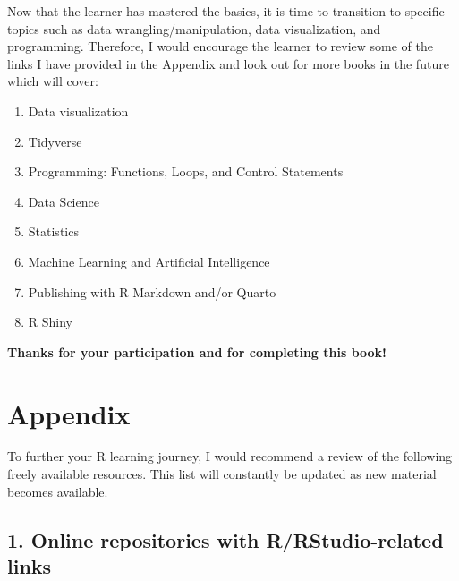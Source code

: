 \documentclass[
  letterpaper,
  DIV=11,
  numbers=noendperiod]{scrreprt}
\begin{document}
Now that the learner has mastered the basics, it is time to transition
to specific topics such as data wrangling/manipulation, data
visualization, and programming. Therefore, I would encourage the learner
to review some of the links I have provided in the Appendix and look out
for more books in the future which will cover:

\begin{enumerate}
\def\labelenumi{\roman{enumi}.}
\item
  Data visualization
\item
  Tidyverse
\item
  Programming: Functions, Loops, and Control Statements
\item
  Data Science
\item
  Statistics
\item
  Machine Learning and Artificial Intelligence
\item
  Publishing with R Markdown and/or Quarto
\item
  R Shiny
\end{enumerate}

\textbf{Thanks for your participation and for completing this book!}


\hypertarget{appendix}{%
\chapter*{Appendix}\label{appendix}}


To further your R learning journey, I would recommend a review of the
following freely available resources. This list will constantly be
updated as new material becomes available.

\hypertarget{online-repositories-with-rrstudio-related-links}{%
\section*{1. Online repositories with R/RStudio-related
links}\label{online-repositories-with-rrstudio-related-links}}

\end{document}

